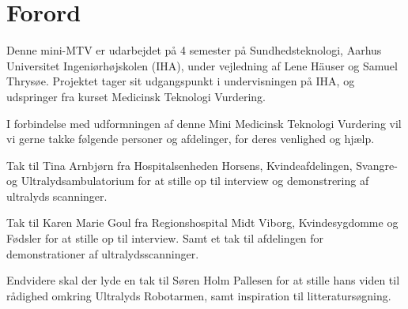 \chapter{Forord}
Denne mini-MTV er udarbejdet på 4 semester på Sundhedsteknologi, Aarhus Universitet Ingeniørhøjskolen (IHA), under vejledning af Lene Häuser og Samuel Thrysøe. Projektet tager sit udgangspunkt i undervisningen på IHA, og udspringer fra kurset Medicinsk Teknologi Vurdering. 


I forbindelse med udformningen af denne Mini Medicinsk Teknologi Vurdering vil vi gerne takke følgende personer og afdelinger, for deres venlighed og hjælp.


Tak til Tina Arnbjørn fra Hospitalsenheden Horsens, Kvindeafdelingen, Svangre- og Ultralydsambulatorium for at stille op til interview og demonstrering af ultralyds scanninger.


Tak til Karen Marie Goul fra Regionshospital Midt Viborg, Kvindesygdomme og Fødsler for at stille op til interview. Samt et tak til afdelingen for demonstrationer af ultralydsscanninger. 


Endvidere skal der lyde en tak til Søren Holm Pallesen for at stille hans viden til rådighed omkring Ultralyds Robotarmen, samt inspiration til litteratursøgning. 

